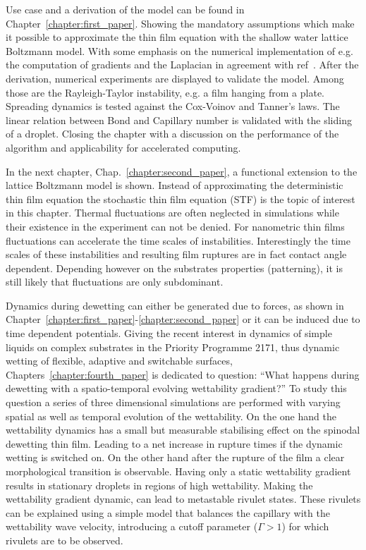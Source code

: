 Use case and a derivation of the model can be found in Chapter~\ref{chapter:first_paper}.
Showing the mandatory assumptions which make it possible to approximate the thin film equation with the shallow water lattice Boltzmann model.
With some emphasis on the numerical implementation of e.g. the computation of gradients and the Laplacian in agreement with ref~\cite{doi:10.1137/S1064827599357188, THAMPI20131}. 
After the derivation, numerical experiments are displayed to validate the model. 
Among those are the Rayleigh-Taylor instability, e.g. a film hanging from a plate. 
Spreading dynamics is tested against the Cox-Voinov and Tanner's laws. 
The linear relation between Bond and Capillary number is validated with the sliding of a droplet.
Closing the chapter with a discussion on the performance of the algorithm and applicability for accelerated computing.

In the next chapter, Chap.~\ref{chapter:second_paper}, a functional extension to the lattice Boltzmann model is shown.
Instead of approximating the deterministic thin film equation the stochastic thin film equation (STF) is the topic of interest in this chapter.
Thermal fluctuations are often neglected in simulations while their existence in the experiment can not be denied.
For nanometric thin films fluctuations can accelerate the time scales of instabilities. 
Interestingly the time scales of these instabilities and resulting film ruptures are in fact contact angle dependent.
Depending however on the substrates properties (patterning), it is still likely that fluctuations are only subdominant.

Dynamics during dewetting can either be generated due to forces, as shown in Chapter~\ref{chapter:first_paper}-\ref{chapter:second_paper} or it can be induced due to time dependent potentials. 
Giving the recent interest in dynamics of simple liquids on complex substrates in the Priority Programme 2171, thus dynamic wetting of flexible, adaptive and switchable surfaces, Chapters~\ref{chapter:fourth_paper} is dedicated to question: ``What happens during dewetting with a spatio-temporal evolving wettability gradient?''
To study this question a series of three dimensional simulations are performed with varying spatial as well as temporal evolution of the wettability.
On the one hand the wettability dynamics has a small but measurable stabilising effect on the spinodal dewetting thin film.
Leading to a net increase in rupture times if the dynamic wetting is switched on.
On the other hand after the rupture of the film a clear morphological transition is observable.
Having only a static wettability gradient results in stationary droplets in regions of high wettability.
Making the wettability gradient dynamic, can lead to metastable rivulet states.
These rivulets can be explained using a simple model that balances the capillary with the wettability wave velocity, introducing a cutoff parameter ($\Gamma > 1$) for which rivulets are to be observed.

